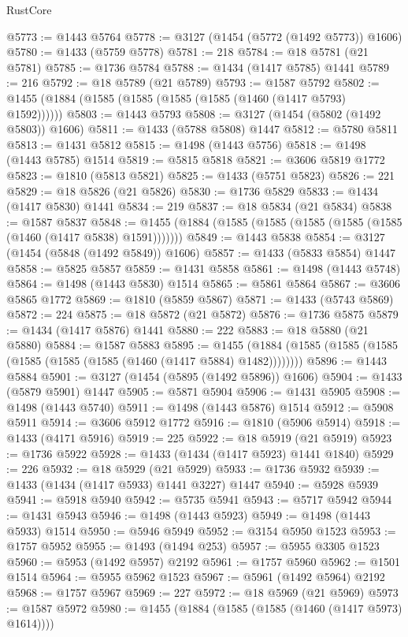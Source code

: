 \begin{lexlean}{RustCore}
\begin{coremodule}
@5773 := @1443 @5764
@5778 := @3127 (@1454 (@5772 (@1492 @5773)) @1606)
@5780 := @1433 (@5759 @5778)
@5781 := 218
@5784 := @18 @5781 (@21 @5781)
@5785 := @1736 @5784
@5788 := @1434 (@1417 @5785) @1441
@5789 := 216
@5792 := @18 @5789 (@21 @5789)
@5793 := @1587 @5792
@5802 := @1455 (@1884 (@1585 (@1585 (@1585 (@1585 (@1460 (@1417 @5793) @1592))))))
@5803 := @1443 @5793
@5808 := @3127 (@1454 (@5802 (@1492 @5803)) @1606)
@5811 := @1433 (@5788 @5808) @1447
@5812 := @5780 @5811
@5813 := @1431 @5812
@5815 := @1498 (@1443 @5756)
@5818 := @1498 (@1443 @5785) @1514
@5819 := @5815 @5818
@5821 := @3606 @5819 @1772
@5823 := @1810 (@5813 @5821)
@5825 := @1433 (@5751 @5823)
@5826 := 221
@5829 := @18 @5826 (@21 @5826)
@5830 := @1736 @5829
@5833 := @1434 (@1417 @5830) @1441
@5834 := 219
@5837 := @18 @5834 (@21 @5834)
@5838 := @1587 @5837
@5848 := @1455 (@1884 (@1585 (@1585 (@1585 (@1585 (@1585 (@1460 (@1417 @5838) @1591)))))))
@5849 := @1443 @5838
@5854 := @3127 (@1454 (@5848 (@1492 @5849)) @1606)
@5857 := @1433 (@5833 @5854) @1447
@5858 := @5825 @5857
@5859 := @1431 @5858
@5861 := @1498 (@1443 @5748)
@5864 := @1498 (@1443 @5830) @1514
@5865 := @5861 @5864
@5867 := @3606 @5865 @1772
@5869 := @1810 (@5859 @5867)
@5871 := @1433 (@5743 @5869)
@5872 := 224
@5875 := @18 @5872 (@21 @5872)
@5876 := @1736 @5875
@5879 := @1434 (@1417 @5876) @1441
@5880 := 222
@5883 := @18 @5880 (@21 @5880)
@5884 := @1587 @5883
@5895 := @1455 (@1884 (@1585 (@1585 (@1585 (@1585 (@1585 (@1585 (@1460 (@1417 @5884) @1482))))))))
@5896 := @1443 @5884
@5901 := @3127 (@1454 (@5895 (@1492 @5896)) @1606)
@5904 := @1433 (@5879 @5901) @1447
@5905 := @5871 @5904
@5906 := @1431 @5905
@5908 := @1498 (@1443 @5740)
@5911 := @1498 (@1443 @5876) @1514
@5912 := @5908 @5911
@5914 := @3606 @5912 @1772
@5916 := @1810 (@5906 @5914)
@5918 := @1433 (@4171 @5916)
@5919 := 225
@5922 := @18 @5919 (@21 @5919)
@5923 := @1736 @5922
@5928 := @1433 (@1434 (@1417 @5923) @1441 @1840)
@5929 := 226
@5932 := @18 @5929 (@21 @5929)
@5933 := @1736 @5932
@5939 := @1433 (@1434 (@1417 @5933) @1441 @3227) @1447
@5940 := @5928 @5939
@5941 := @5918 @5940
@5942 := @5735 @5941
@5943 := @5717 @5942
@5944 := @1431 @5943
@5946 := @1498 (@1443 @5923)
@5949 := @1498 (@1443 @5933) @1514
@5950 := @5946 @5949
@5952 := @3154 @5950 @1523
@5953 := @1757 @5952
@5955 := @1493 (@1494 @253)
@5957 := @5955 @3305 @1523
@5960 := @5953 (@1492 @5957) @2192
@5961 := @1757 @5960
@5962 := @1501 @1514
@5964 := @5955 @5962 @1523
@5967 := @5961 (@1492 @5964) @2192
@5968 := @1757 @5967
@5969 := 227
@5972 := @18 @5969 (@21 @5969)
@5973 := @1587 @5972
@5980 := @1455 (@1884 (@1585 (@1585 (@1460 (@1417 @5973) @1614))))

\end{coremodule}
\end{lexlean}
